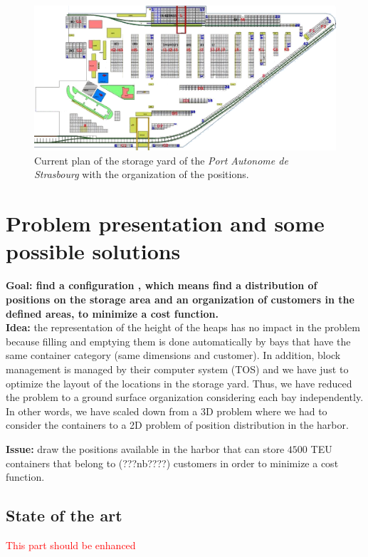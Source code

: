 \documentclass{article}
\newcommand{\ls}[1]{\textcolor{red}{#1}}
\newcommand{\PAS}{\emph{Port Autonome de Strasbourg }}
\begin{document}
\begin{figure}[!htb]
\centering
\includegraphics[width=\linewidth]{images/Plan_Terminal.png}
\caption{Current plan of the storage yard of the \PAS with the organization of the positions.}
\label{fig:pas_config}
\end{figure}




\section{Problem presentation and some possible solutions}

\textbf{Goal: find a configuration , which means find a distribution of positions on the storage area and an organization of customers in the defined areas, to minimize a cost function.} \\

\noindent
\textbf{Idea:} the representation of the height of the heaps has no impact in the problem because filling and emptying them is done automatically by bays that have the same container category (same dimensions and customer).
In addition, block management is managed by their computer system (TOS) and we have just to optimize the layout of the locations in the storage yard.
Thus, we have reduced the problem to a ground surface organization considering each bay independently. 
In other words, we have scaled down from a 3D problem where we had to consider the containers to a 2D problem of position distribution in the harbor.


\noindent
{\bf Issue: } draw the positions available in the harbor that can store $ 4500 $ TEU containers that belong to (???nb????) customers in order to minimize a cost function.


\subsection{State of the art} 
\ls{This part should be enhanced}
\end{document}
